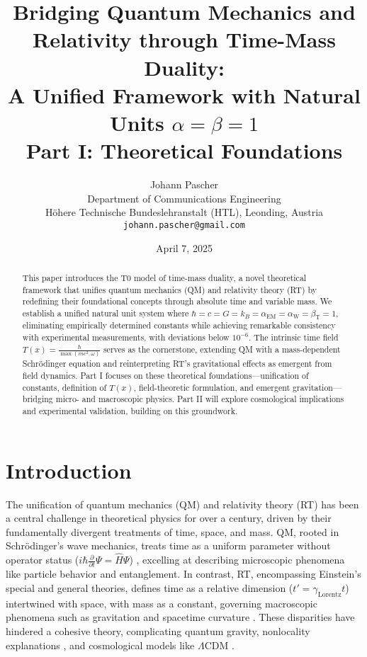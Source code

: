 \documentclass[12pt,a4paper]{article}
\title{Bridging Quantum Mechanics and Relativity through Time-Mass Duality: \\ A Unified Framework with Natural Units \(\alpha = \beta = 1\) \\ Part I: Theoretical Foundations}
\author{Johann Pascher\\
	Department of Communications Engineering\\
	Höhere Technische Bundeslehranstalt (HTL), Leonding, Austria\\
	\texttt{johann.pascher@gmail.com}}
\date{April 7, 2025}
\newcommand{\Tfield}{T(x)}
\newcommand{\alphaEM}{\alpha_{\text{EM}}}
\newcommand{\alphaW}{\alpha_{\text{W}}}
\newcommand{\betaT}{\beta_{\text{T}}}
\newcommand{\gammaf}{\gamma_{\text{Lorentz}}}
\begin{document}
	
	\maketitle
	
	\begin{abstract}
		This paper introduces the T0 model of time-mass duality, a novel theoretical framework that unifies quantum mechanics (QM) and relativity theory (RT) by redefining their foundational concepts through absolute time and variable mass. We establish a unified natural unit system where \(\hbar = c = G = k_B = \alphaEM = \alphaW = \betaT = 1\), eliminating empirically determined constants while achieving remarkable consistency with experimental measurements, with deviations below \(10^{-6}\). The intrinsic time field \(\Tfield = \frac{\hbar}{\max(mc^2, \omega)}\) serves as the cornerstone, extending QM with a mass-dependent Schrödinger equation and reinterpreting RT’s gravitational effects as emergent from field dynamics. Part I focuses on these theoretical foundations—unification of constants, definition of \(\Tfield\), field-theoretic formulation, and emergent gravitation—bridging micro- and macroscopic physics. Part II will explore cosmological implications and experimental validation, building on this groundwork.
	\end{abstract}
	
	\section{Introduction}
	\label{sec:introduction}
	
	The unification of quantum mechanics (QM) and relativity theory (RT) has been a central challenge in theoretical physics for over a century, driven by their fundamentally divergent treatments of time, space, and mass. QM, rooted in Schrödinger’s wave mechanics, treats time as a uniform parameter without operator status (\(i\hbar \frac{\partial}{\partial t}\Psi = \hat{H}\Psi\)) \cite{schrodinger1926}, excelling at describing microscopic phenomena like particle behavior and entanglement. In contrast, RT, encompassing Einstein’s special and general theories, defines time as a relative dimension (\(t' = \gammaf t\)) intertwined with space, with mass as a constant, governing macroscopic phenomena such as gravitation and spacetime curvature \cite{einstein1905,einstein1915}. These disparities have hindered a cohesive theory, complicating quantum gravity, nonlocality explanations \cite{bell1964}, and cosmological models like \(\Lambda\)CDM \cite{Planck2020}.
	
\end{document}
